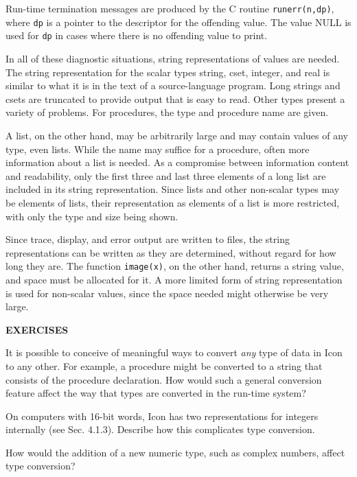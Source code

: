 Run-time termination messages are produced by the C routine
\texttt{runerr(n,dp)}, where \texttt{dp} is a pointer to the
descriptor for the offending value. The value NULL is used for
\texttt{dp} in cases where there is no offending value to print.

In all of these diagnostic situations, string representations of
values are needed. The string representation for the
{\textquotedbl}scalar{\textquotedbl} types string, cset, integer, and
real is similar to what it is in the text of a source-language
program. Long strings and csets are truncated to provide output that
is easy to read. Other types present a variety of problems. For
procedures, the type and procedure name are given.

A list, on the other hand, may be arbitrarily large and may contain
values of any type, even lists. While the name may suffice for a
procedure, often more information about a list is needed. As a
compromise between information content and readability, only the first
three and last three elements of a long list are included in its
string representation.  Since lists and other non-scalar types may be
elements of lists, their representation as elements of a list is more
restricted, with only the type and size being shown.

Since trace, display, and error output are written to files, the
string representations can be written as they are determined, without
regard for how long they are. The function \texttt{image(x)}, on the
other hand, returns a string value, and space must be allocated for
it. A more limited form of string representation is used for
non-scalar values, since the space needed might otherwise be very
large.

\bigskip

\noindent\textbf{EXERCISES}

 It is possible to conceive of meaningful ways to convert
\textit{any} type of data in Icon to any other. For example, a
procedure might be converted to a string that consists of the
procedure declaration. How would such a general conversion feature
affect the way that types are converted in the run-time system?

 On computers with 16-bit words, Icon has two
representations for integers internally (see Sec. 4.1.3). Describe how
this complicates type conversion.

 How would the addition of a new numeric type,
such as complex numbers, affect type conversion?

